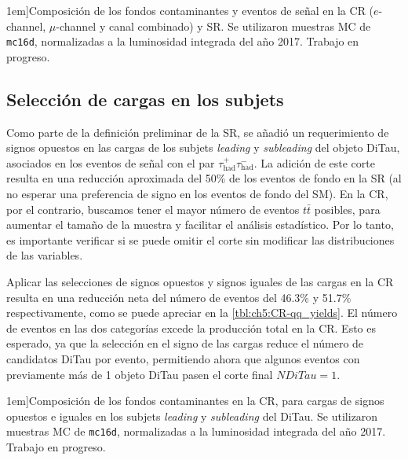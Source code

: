 \begin{table}[t]
    \footnotesize
    \setlength{\tabcolsep}{1mm}
    

    \caption[][1em]{Composición de los fondos contaminantes y eventos de señal en la CR ($e$-channel, $\mu$-channel y canal combinado) y SR. Se utilizaron muestras MC de \texttt{mc16d}, normalizadas a la luminosidad integrada del año 2017. Trabajo en progreso.}
    \label{tbl:ch5:CR-SR_yields}
\end{table}


\subsection{Selección de cargas en los subjets}

Como parte de la definición preliminar de la SR, se añadió un requerimiento de signos opuestos en las cargas de los subjets \textit{leading} y \textit{subleading} del objeto DiTau, asociados en los eventos de señal con el par $\tau_{\text{had}}^+\tau_{\text{had}}^-$. La adición de este corte resulta en una reducción aproximada del 50\% de los eventos de fondo en la SR (al no esperar una preferencia de signo en los eventos de fondo del SM). En la CR, por el contrario, buscamos tener el mayor número de eventos $t\bar{t}$ posibles, para aumentar el tamaño de la muestra y facilitar el análisis estadístico. Por lo tanto, es importante verificar si se puede omitir el corte sin modificar las distribuciones de las variables.

Aplicar las selecciones de signos opuestos y signos iguales de las cargas en la CR resulta en una reducción neta del número de eventos del 46.3\% y 51.7\% respectivamente, como se puede apreciar en la \cref{tbl:ch5:CR-qq_yields}. El número de eventos en las dos categorías excede la producción total en la CR. Esto es esperado, ya que la selección en el signo de las cargas reduce el número de candidatos DiTau por evento, permitiendo ahora que algunos eventos con previamente más de 1 objeto DiTau pasen el corte final $NDiTau = 1$.

\begin{table}[t]
    \footnotesize
    \setlength{\tabcolsep}{1mm}
    

    \caption[][1em]{Composición de los fondos contaminantes en la CR, para cargas de signos opuestos e iguales en los subjets \textit{leading} y \textit{subleading} del DiTau. Se utilizaron muestras MC de \texttt{mc16d}, normalizadas a la luminosidad integrada del año 2017. Trabajo en progreso.}
    \label{tbl:ch5:CR-qq_yields}
\end{table}


